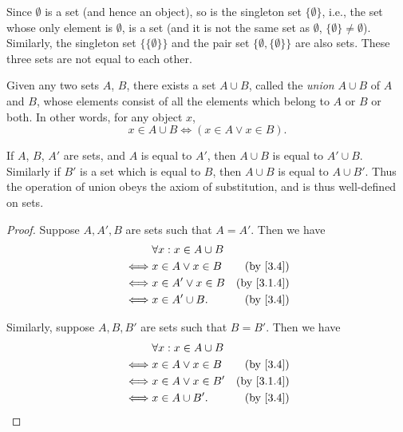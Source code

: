\begin{eg}\label{3.1.10}
  Since \(\emptyset\) is a set (and hence an object), so is the singleton set \(\{\emptyset\}\), i.e., the set whose only element is \(\emptyset\), is a set (and it is not the same set as \(\emptyset\), \(\{\emptyset\} \neq \emptyset\)).
  Similarly, the singleton set \(\{\{\emptyset\}\}\) and the pair set \(\{\emptyset, \{\emptyset\}\}\) are also sets.
  These three sets are not equal to each other.
\end{eg}

\begin{ax}\label{3.4}
  Given any two sets \(A\), \(B\), there exists a set \(A \cup B\), called the \emph{union} \(A \cup B\) of \(A\) and \(B\), whose elements consist of all the elements which belong to \(A\) or \(B\) or both.
  In other words, for any object \(x\),
  \[
    x \in A \cup B \iff (x \in A \lor x \in B).
  \]
\end{ax}

\setcounter{thm}{11}
\begin{rmk}\label{3.1.12}
  If \(A\), \(B\), \(A'\) are sets, and \(A\) is equal to \(A'\), then \(A \cup B\) is equal to \(A' \cup B\).
  Similarly if \(B'\) is a set which is equal to \(B\), then \(A \cup B\) is equal to \(A \cup B'\).
  Thus the operation of union obeys the axiom of substitution, and is thus well-defined on sets.
\end{rmk}

\begin{proof}
  Suppose \(A, A', B\) are sets such that \(A = A'\).
  Then we have
  \begin{align*}
         & \forall x : x \in A \cup B                            \\
    \iff & x \in A \lor x \in B       & \text{(by \cref{3.4})}   \\
    \iff & x \in A' \lor x \in B      & \text{(by \cref{3.1.4})} \\
    \iff & x \in A' \cup B.           & \text{(by \cref{3.4})}
  \end{align*}

  Similarly, suppose \(A, B, B'\) are sets such that \(B = B'\).
  Then we have
  \begin{align*}
         & \forall x : x \in A \cup B                            \\
    \iff & x \in A \lor x \in B       & \text{(by \cref{3.4})}   \\
    \iff & x \in A \lor x \in B'      & \text{(by \cref{3.1.4})} \\
    \iff & x \in A \cup B'.           & \text{(by \cref{3.4})}
  \end{align*}
\end{proof}

